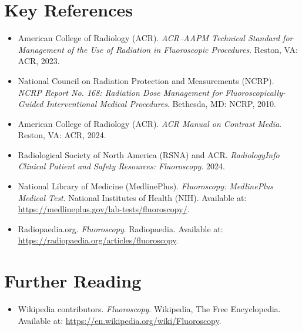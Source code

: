 \section{Key References}

\begin{itemize}
    \item American College of Radiology (ACR). \textit{ACR--AAPM Technical Standard for Management of the Use of Radiation in Fluoroscopic Procedures}. Reston, VA: ACR, 2023.
    \item National Council on Radiation Protection and Measurements (NCRP). \textit{NCRP Report No. 168: Radiation Dose Management for Fluoroscopically-Guided Interventional Medical Procedures}. Bethesda, MD: NCRP, 2010.
    \item American College of Radiology (ACR). \textit{ACR Manual on Contrast Media}. Reston, VA: ACR, 2024.
    \item Radiological Society of North America (RSNA) and ACR. \textit{RadiologyInfo Clinical Patient and Safety Resources: Fluoroscopy}. 2024.
    \item National Library of Medicine (MedlinePlus). \textit{Fluoroscopy: MedlinePlus Medical Test}. National Institutes of Health (NIH). Available at: \url{https://medlineplus.gov/lab-tests/fluoroscopy/}.
    \item Radiopaedia.org. \textit{Fluoroscopy}. Radiopaedia. Available at: \url{https://radiopaedia.org/articles/fluoroscopy}.
\end{itemize}

\section{Further Reading}
\begin{itemize}
  \item Wikipedia contributors. \textit{Fluoroscopy}. Wikipedia, The Free Encyclopedia. Available at: \url{https://en.wikipedia.org/wiki/Fluoroscopy}.
\end{itemize}
